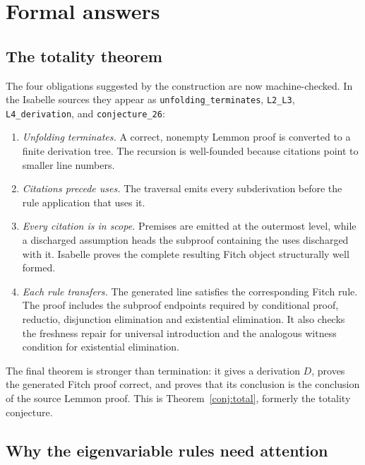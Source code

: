 \documentclass[11pt]{article}
\theoremstyle{plain}
\theoremstyle{definition}
\theoremstyle{remark}
\begin{document}
\section{Formal answers}\label{sec:open}

\subsection{The totality theorem}

The four obligations suggested by the construction are now machine-checked.
In the Isabelle sources they appear as
\verb|unfolding_terminates|, \verb|L2_L3|, \verb|L4_derivation|, and
\verb|conjecture_26|:

\begin{enumerate}
\item[(L1)] \emph{Unfolding terminates.} A correct, nonempty Lemmon proof is
converted to a finite derivation tree. The recursion is well-founded because
citations point to smaller line numbers.

\item[(L2)] \emph{Citations precede uses.} The traversal emits every
subderivation before the rule application that uses it.

\item[(L3)] \emph{Every citation is in scope.} Premises are emitted at the
outermost level, while a discharged assumption heads the subproof containing
the uses discharged with it. Isabelle proves the complete resulting Fitch
object structurally well formed.

\item[(L4)] \emph{Each rule transfers.} The generated line satisfies the
corresponding Fitch rule. The proof includes the subproof endpoints required
by conditional proof, reductio, disjunction elimination and existential
elimination. It also checks the freshness repair for universal introduction
and the analogous witness condition for existential elimination.
\end{enumerate}

The final theorem is stronger than termination: it gives a derivation $D$,
proves the generated Fitch proof correct, and proves that its conclusion is
the conclusion of the source Lemmon proof. This is
Theorem~\ref{conj:total}, formerly the totality conjecture.

\subsection{Why the eigenvariable rules need attention}\label{sec:eigen}
\end{document}
